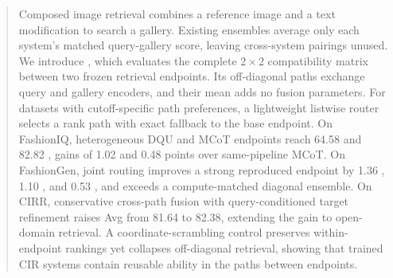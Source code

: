 \begin{abstract}
Composed image retrieval combines a reference image and a text modification to search a gallery. Existing ensembles average only each system's matched query-gallery score, leaving cross-system pairings unused. We introduce \method, which evaluates the complete $2\times2$ compatibility matrix between two frozen retrieval endpoints. Its off-diagonal paths exchange query and gallery encoders, and their mean adds no fusion parameters. For datasets with cutoff-specific path preferences, a lightweight listwise router selects a rank path with exact fallback to the base endpoint. On FashionIQ, heterogeneous DQU and MCoT endpoints reach 64.58 \Rten and 82.82 \Rfifty, gains of 1.02 and 0.48 points over same-pipeline MCoT. On FashionGen, joint routing improves a strong reproduced endpoint by 1.36 \Rone, 1.10 \Rfive, and 0.53 \Rten, and exceeds a compute-matched diagonal ensemble. On CIRR, conservative cross-path fusion with query-conditioned target refinement raises Avg from 81.64 to 82.38, extending the gain to open-domain retrieval. A coordinate-scrambling control preserves within-endpoint rankings yet collapses off-diagonal retrieval, showing that trained CIR systems contain reusable ability in the paths between endpoints.
\end{abstract}
